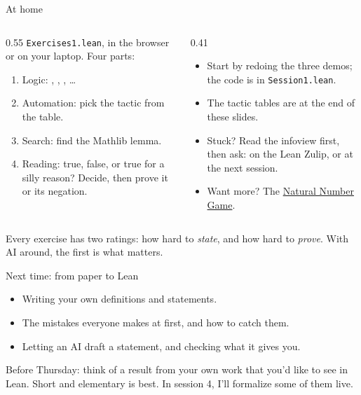 \documentclass[10pt, aspectratio=169]{beamer}
\begin{document}
\begin{frame}[fragile]{At home}
\begin{columns}[T]
\begin{column}{0.55\textwidth}
\texttt{Exercises1.lean}, in the browser or on your laptop. Four parts:
\begin{enumerate}
\item Logic: , , , \dots
\item Automation: pick the tactic from the table.
\item Search: find the Mathlib lemma.
\item Reading: true, false, or true for a silly reason? Decide, then prove it or its negation.
\end{enumerate}
\end{column}
\begin{column}{0.41\textwidth}
\begin{itemize}
\item Start by redoing the three demos; the code is in \texttt{Session1.lean}.
\item The tactic tables are at the end of these slides.
\item Stuck? Read the infoview first, then ask: on the Lean Zulip, or at the next session.
\item Want more? The \href{https://adam.math.hhu.de/\#/g/leanprover-community/nng4}{Natural Number Game}.
\end{itemize}
\end{column}
\end{columns}

\vspace{0.3em}
\begin{keypoint}
\normalsize Every exercise has two ratings: how hard to \emph{state}, and how hard to \emph{prove}. With AI around, the first is what matters.
\end{keypoint}
\end{frame}

\begin{frame}[fragile]{Next time: from paper to Lean}
\begin{itemize}
\item Writing your own definitions and statements.
\item The mistakes everyone makes at first, and how to catch them.
\item Letting an AI draft a statement, and checking what it gives you.
\end{itemize}

\vspace{1em}
\begin{keypoint}
\normalsize Before Thursday: think of a result from your own work that you'd like to see in Lean. Short and elementary is best. In session 4, I'll formalize some of them live.
\end{keypoint}
\end{frame}
\end{document}
